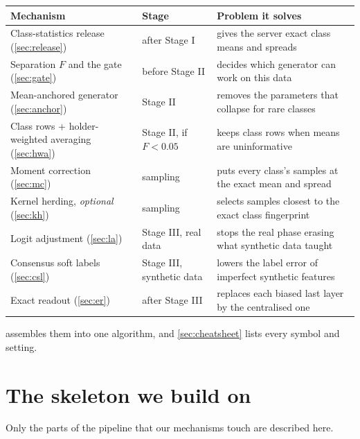 \documentclass[11pt]{article}
\theoremstyle{plain}
\theoremstyle{definition}
\begin{document}
\begin{center}
\small
\begin{tabularx}{\linewidth}{>{\raggedright\arraybackslash}p{3.1cm}>{\raggedright\arraybackslash}p{1.7cm}X}
\toprule
Mechanism & Stage & Problem it solves\\
\midrule
Class-statistics release (\cref{sec:release}) & after Stage I & gives the server exact class means and spreads\\
Separation $F$ and the gate (\cref{sec:gate}) & before Stage II & decides which generator can work on this data\\
Mean-anchored generator (\cref{sec:anchor}) & Stage II & removes the parameters that collapse for rare classes\\
Class rows + holder-weighted averaging (\cref{sec:hwa}) & Stage II, if $F<0.05$ & keeps class rows when means are uninformative\\
Moment correction (\cref{sec:mc}) & sampling & puts every class's samples at the exact mean and spread\\
Kernel herding, \emph{optional} (\cref{sec:kh}) & sampling & selects samples closest to the exact class fingerprint\\
Logit adjustment (\cref{sec:la}) & Stage III, real data & stops the real phase erasing what synthetic data taught\\
Consensus soft labels (\cref{sec:csl}) & Stage III, synthetic data & lowers the label error of imperfect synthetic features\\
Exact readout (\cref{sec:er}) & after Stage III & replaces each biased last layer by the centralised one\\
\bottomrule
\end{tabularx}
\end{center}

 assembles them into one algorithm, and \cref{sec:cheatsheet} lists every symbol and setting.

\section{The skeleton we build on}\label{sec:skeleton}

Only the parts of the pipeline that our mechanisms touch are described here.
\end{document}
